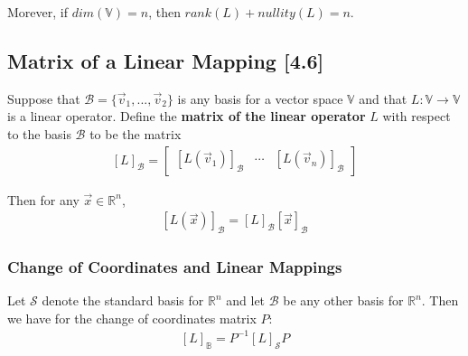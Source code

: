 \documentclass[a4paper,9pt]{extarticle}
\begin{document}
\begin{multicols*}{2}
\noindent Morever, if $dim(\mathbb{V}) = n$, then $rank(L) + nullity(L) = n$.


\subsection{Matrix of a Linear Mapping [4.6]}

Suppose that $\mathcal{B} = \{\vec{v}_1, ..., \vec{v}_2\}$ is any basis for a vector space $\mathbb{V}$ and that $L : \mathbb{V} \to \mathbb{V}$ is a linear operator. Define the \textbf{matrix of the linear operator} $L$ with respect to the basis $\mathcal{B}$ to be the matrix
\begin{equation} \label{4.6-1}
    \begin{split}
        [L]_{\mathcal{B}} = \begin{bmatrix}[L(\vec{v}_1)]_{\mathcal{B}} & \cdots & [L(\vec{v}_n)]_{\mathcal{B}}\end{bmatrix}
    \end{split}
\end{equation}

\noindent Then for any $\vec{x} \in \mathbb{R}^n$,
\begin{equation} \label{4.6-2}
    \begin{split}
        [L(\vec{x})]_{\mathcal{B}} = [L]_{\mathcal{B}} [\vec{x}]_{\mathcal{B}}
    \end{split}
\end{equation}


\subsubsection{Change of Coordinates and Linear Mappings}
Let $\mathcal{S}$ denote the standard basis for $\mathbb{R}^n$ and let $\mathcal{B}$ be any other basis for $\mathbb{R}^n$. Then we have for the change of coordinates matrix $P$:
\begin{equation} \label{4.6-3}
    \begin{split}
        [L]_{\mathbb{B}} = P^{-1} [L]_{\mathcal{S}} P
    \end{split}
\end{equation}






\end{multicols*}
\end{document}
